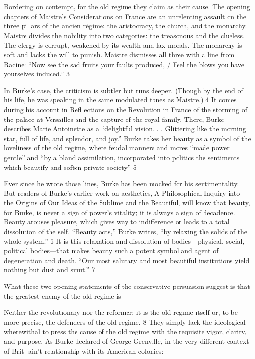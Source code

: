 Bordering on contempt, for the old regime they claim as their cause. The opening chapters of Maistre’s Considerations on France are an unrelenting assault on the three pillars of the ancien régime: the aristocracy, the church, and the monarchy. Maistre divides the nobility into two categories: the treasonous and the clueless. The clergy is corrupt, weakened by its wealth and lax morals. The monarchy is soft and lacks the will to punish. Maistre dismisses all three with a line from Racine: “Now see the sad fruits your faults produced, / Feel the blows you have yourselves induced.” 3
 \par 
In Burke’s case, the criticism is subtler but runs deeper. (Though by the end of his life, he was speaking in the same modulated tones as Maistre.) 4 It comes during his account in Refl ections on the Revolution in France of the storming of the palace at Versailles and the capture of the royal family. There, Burke describes Marie Antoinette as a “delightful vision. . . Glittering like the morning star, full of life, and splendor, and joy.” Burke takes her beauty as a symbol of the loveliness of the old regime, where feudal manners and mores “made power gentle” and “by a bland assimilation, incorporated into politics the sentiments which beautify and soften private society.” 5
 \par 
Ever since he wrote those lines, Burke has been mocked for his sentimentality. But readers of Burke’s earlier work on aesthetics, A Philosophical Inquiry into the Origins of Our Ideas of the Sublime and the Beautiful, will know that beauty, for Burke, is never a sign of power’s vitality; it is always a sign of decadence. Beauty arouses pleasure, which gives way to indifference or leads to a total dissolution of the self. “Beauty acts,” Burke writes, “by relaxing the solids of the whole system.” 6 It is this relaxation and dissolution of bodies—physical, social, political bodies—that makes beauty such a potent symbol and agent of degeneration and death. “Our most salutary and most beautiful institutions yield nothing but dust and smut.” 7
 \par 
What these two opening statements of the conservative persuasion suggest is that the greatest enemy of the old regime is
 \par 
Neither the revolutionary nor the reformer; it is the old regime itself or, to be more precise, the defenders of the old regime. 8 They simply lack the ideological wherewithal to press the cause of the old regime with the requisite vigor, clarity, and purpose. As Burke declared of George Grenville, in the very different context of Brit- ain't relationship with its American colonies:
